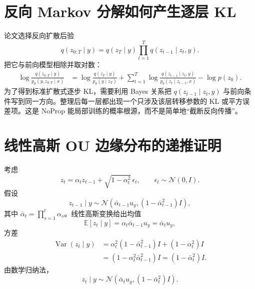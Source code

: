 \documentclass[UTF8,12pt,a4paper,fontset=none]{ctexart}
\numberwithin{equation}{section}
\newcommand{\E}{\mathbb{E}}
\begin{document}
\section{反向 Markov 分解如何产生逐层 KL}
论文选择反向扩散后验
\begin{equation}
 q(z_{0:T}\mid y)=q(z_T\mid y)\prod_{t=1}^{T}q(z_{t-1}\mid z_t,y).
\end{equation}
把它与前向模型相除并取对数：
\begin{align}
 \log\frac{q(z_{0:T}\mid y)}{p_\theta(y,z_{0:T}\mid x)}
 &=\log\frac{q(z_T\mid y)}{p_\theta(y\mid z_T)}
 +\sum_{t=1}^{T}
 \log\frac{q(z_{t-1}\mid z_t,y)}{p_\theta(z_t\mid z_{t-1},x)}
 -\log p(z_0).
\end{align}
为了得到标准扩散式逐步 KL，需要利用 Bayes 关系把 $q(z_{t-1}\mid z_t,y)$ 与前向条件写到同一方向。整理后每一层都出现一个只涉及该层转移参数的 KL 或平方误差项。这是 NoProp 能局部训练的概率根源，而不是简单地“截断反向传播”。

\section{线性高斯 OU 边缘分布的递推证明}
考虑
\begin{equation}
 z_t=\alpha_t z_{t-1}+\sqrt{1-\alpha_t^2}\,\epsilon_t,
 \qquad \epsilon_t\sim\mathcal N(0,I).
\end{equation}
假设
\begin{equation}
 z_{t-1}\mid y\sim
 \mathcal N(\bar\alpha_{t-1}u_y,(1-\bar\alpha_{t-1}^2)I),
\end{equation}
其中 $\bar\alpha_t=\prod_{s=1}^{t}\alpha_s$。线性高斯变换给出均值
\begin{equation}
 \E[z_t\mid y]=\alpha_t\bar\alpha_{t-1}u_y=\bar\alpha_tu_y,
\end{equation}
方差
\begin{align}
 \operatorname{Var}(z_t\mid y)
 &=\alpha_t^2(1-\bar\alpha_{t-1}^2)I+(1-\alpha_t^2)I\\
 &=(1-\alpha_t^2\bar\alpha_{t-1}^2)I
 =(1-\bar\alpha_t^2)I.
\end{align}
由数学归纳法，
\begin{equation}
 \boxed{z_t\mid y\sim
 \mathcal N(\bar\alpha_tu_y,(1-\bar\alpha_t^2)I).}
\end{equation}
\end{document}
